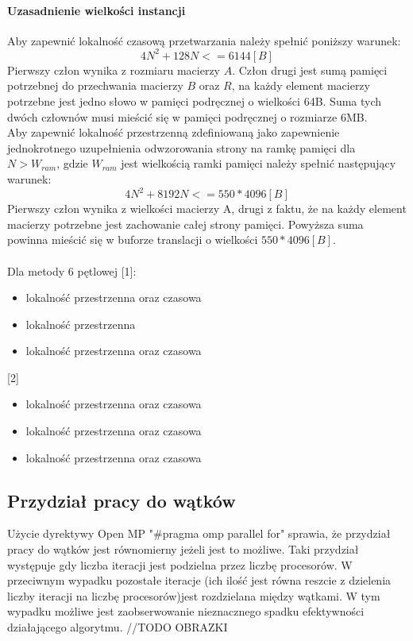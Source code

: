 \documentclass{scrartcl}
\begin{document}
\paragraph{Uzasadnienie wielkości instancji} Aby zapewnić lokalność czasową przetwarzania należy spełnić poniższy warunek:
\begin{equation}
4N ^ 2 + 128N <= 6144 [B]
\end{equation}
Pierwszy człon wynika z rozmiaru macierzy $A$. Człon drugi jest sumą pamięci potrzebnej do przechwania macierzy $B$ oraz $R$, na każdy element macierzy potrzebne jest jedno słowo w pamięci podręcznej o wielkości 64B. Suma tych dwóch człownów musi mieścić się w pamięci podręcznej o rozmiarze 6MB. \\
Aby zapewnić lokalność przestrzenną zdefiniowaną jako zapewnienie jednokrotnego uzupełnienia odwzorowania strony na ramkę pamięci dla $N > W_{ram}$, gdzie $W_{ram}$ jest wielkością ramki pamięci należy spełnić następujący warunek:
\begin{equation}
4N ^ 2 + 8192 N <= 550 * 4096 [B]
\end{equation}
Pierwszy człon wynika z wielkości macierzy A, drugi z faktu, że na każdy element macierzy potrzebne jest zachowanie całej strony pamięci. Powyższa suma powinna mieścić się w buforze translacji o wielkości $550 * 4096[B]$.
\paragraph{}
Dla metody 6 pętlowej [1]:
\begin{itemize}
\item lokalność przestrzenna oraz czasowa
\item lokalność przestrzenna
\item lokalność przestrzenna oraz czasowa
\end{itemize}
[2]
\begin{itemize}
\item lokalność przestrzenna oraz czasowa
\item lokalność przestrzenna oraz czasowa
\item lokalność przestrzenna oraz czasowa
\end{itemize}
\subsection{Przydział pracy do wątków}
Użycie dyrektywy Open MP "\#pragma omp parallel for" sprawia, że przydział pracy do wątków jest równomierny jeżeli jest to możliwe. Taki przydział występuje gdy liczba iteracji jest podzielna przez liczbę procesorów. W przeciwnym wypadku pozostałe iteracje (ich ilość jest równa reszcie z dzielenia liczby iteracji na liczbę procesorów)jest rozdzielana między wątkami. W tym wypadku możliwe jest zaobserwowanie nieznacznego spadku efektywności działającego algorytmu.
//TODO OBRAZKI
\subsection{}
\end{document}
